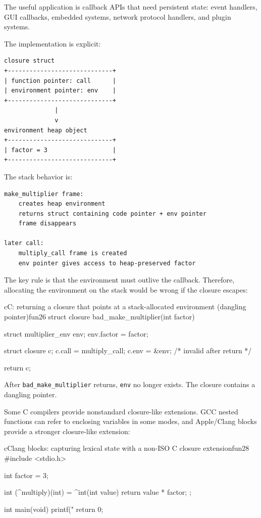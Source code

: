 \documentclass[a4paper,twoside]{report}
\begin{document}
The useful application is callback APIs that need persistent state: event handlers, GUI callbacks, embedded systems, network protocol handlers, and plugin systems.

The implementation is explicit:

\begin{verbatim}
closure struct
+-----------------------------+
| function pointer: call      |
| environment pointer: env    |
+-----------------------------+
              |
              v
environment heap object
+-----------------------------+
| factor = 3                  |
+-----------------------------+
\end{verbatim}

The stack behavior is:

\begin{verbatim}
make_multiplier frame:
    creates heap environment
    returns struct containing code pointer + env pointer
    frame disappears

later call:
    multiply_call frame is created
    env pointer gives access to heap-preserved factor
\end{verbatim}

The key rule is that the environment must outlive the callback. Therefore, allocating the environment on the stack would be wrong if the closure escapes:

\begin{codebox}[]{c}{C: returning a closure that points at a stack-allocated environment (dangling pointer)}{fun26}
struct closure bad_make_multiplier(int factor) {
    struct multiplier_env env;
    env.factor = factor;

    struct closure c;
    c.call = multiply_call;
    c.env = &env;  /* invalid after return */

    return c;
}
\end{codebox}



After \texttt{bad\_make\_multiplier} returns, \texttt{env} no longer exists. The closure contains a dangling pointer.

Some C compilers provide nonstandard closure-like extensions. GCC nested functions can refer to enclosing variables in some modes, and Apple/Clang blocks provide a stronger closure-like extension:

\begin{codebox}[]{c}{Clang blocks: capturing lexical state with a non-ISO C closure extension}{fun28}
#include <stdio.h>

int factor = 3;

int (^multiply)(int) = ^int(int value) {
    return value * factor;
};

int main(void) {
    printf("%
    return 0;
}
\end{codebox}
\end{document}

